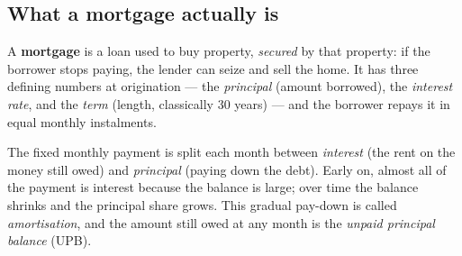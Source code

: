 \documentclass[11pt]{article}
\begin{document}
\subsection{What a mortgage actually is}

A \textbf{mortgage} is a loan used to buy property, \emph{secured} by that property: if the
borrower stops paying, the lender can seize and sell the home. It has three defining numbers
at origination --- the \emph{principal} (amount borrowed), the \emph{interest rate}, and the
\emph{term} (length, classically 30 years) --- and the borrower repays it in equal monthly
instalments.

\begin{jargon}
The fixed monthly payment is split each month between \emph{interest} (the rent on the money
still owed) and \emph{principal} (paying down the debt). Early on, almost all of the payment
is interest because the balance is large; over time the balance shrinks and the principal
share grows. This gradual pay-down is called \emph{amortisation}, and the amount still owed
at any month is the \emph{unpaid principal balance} (UPB).
\end{jargon}
\end{document}
